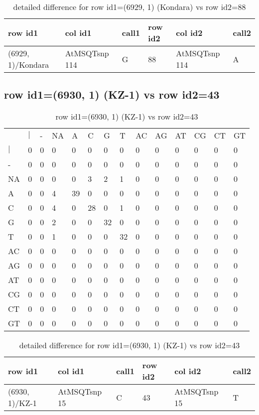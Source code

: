 \begin{center}
\begin{longtable}{|l|l|l|l|l|l|}
\caption{detailed difference for row id1=(6929, 1) (Kondara) vs row id2=88} \label{table_dm125}\\
\hline
row id1&col id1&call1&row id2&col id2&call2\\
\hline
(6929, 1)/Kondara&AtMSQTsnp 114&G&88&AtMSQTsnp 114&A\\
\hline
\end{longtable}
\end{center}

\subsection{row id1=(6930, 1) (KZ-1) vs row id2=43}
\begin{center}
\begin{longtable}{|l|l|l|l|l|l|l|l|l|l|l|l|l|l|}
\caption{row id1=(6930, 1) (KZ-1) vs row id2=43} \label{table_dm126}\\
\hline
\\
\hline
&$|$&-&NA&A&C&G&T&AC&AG&AT&CG&CT&GT\\
$|$&0&0&0&0&0&0&0&0&0&0&0&0&0\\
-&0&0&0&0&0&0&0&0&0&0&0&0&0\\
NA&0&0&0&0&3&2&1&0&0&0&0&0&0\\
A&0&0&4&39&0&0&0&0&0&0&0&0&0\\
C&0&0&4&0&28&0&1&0&0&0&0&0&0\\
G&0&0&2&0&0&32&0&0&0&0&0&0&0\\
T&0&0&1&0&0&0&32&0&0&0&0&0&0\\
AC&0&0&0&0&0&0&0&0&0&0&0&0&0\\
AG&0&0&0&0&0&0&0&0&0&0&0&0&0\\
AT&0&0&0&0&0&0&0&0&0&0&0&0&0\\
CG&0&0&0&0&0&0&0&0&0&0&0&0&0\\
CT&0&0&0&0&0&0&0&0&0&0&0&0&0\\
GT&0&0&0&0&0&0&0&0&0&0&0&0&0\\
\hline
\end{longtable}
\end{center}

\begin{center}
\begin{longtable}{|l|l|l|l|l|l|}
\caption{detailed difference for row id1=(6930, 1) (KZ-1) vs row id2=43} \label{table_dm127}\\
\hline
row id1&col id1&call1&row id2&col id2&call2\\
\hline
(6930, 1)/KZ-1&AtMSQTsnp 15&C&43&AtMSQTsnp 15&T\\
\hline
\end{longtable}
\end{center}

